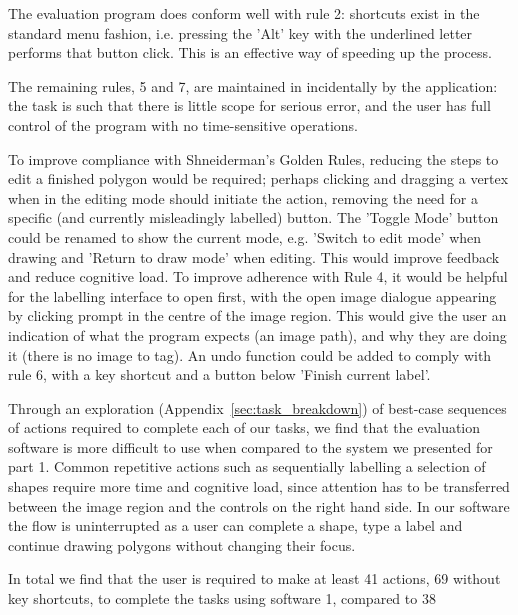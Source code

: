 \documentclass[a4paper,11pt,oneside]{article}
\begin{document}
The evaluation program does conform well with rule 2: shortcuts exist in the standard menu fashion, i.e. pressing the 'Alt' key with the underlined letter performs that button click. This is an effective way of speeding up the process.

The remaining rules, 5 and 7, are maintained in incidentally by the application: the task is such that there is little scope for serious error, and the user has full control of the program with no time-sensitive operations.

To improve compliance with Shneiderman's Golden Rules, reducing the steps to edit a finished polygon would be required; perhaps clicking and dragging a vertex when in the editing mode should initiate the action, removing the need for a specific (and currently misleadingly labelled) button. The 'Toggle Mode' button could be renamed to show the current mode, e.g. 'Switch to edit mode' when drawing and 'Return to draw mode' when editing. This would improve feedback and reduce cognitive load. To improve adherence with Rule 4, it would be helpful for the labelling interface to open first, with the open image dialogue appearing by clicking prompt in the centre of the image region. This would give the user an indication of what the program expects (an image path), and why they are doing it (there is no image to tag). An undo function could be added to comply with rule 6, with a key shortcut and a button below 'Finish current label'.

Through an exploration (Appendix~\ref{sec:task_breakdown}) of best-case sequences of actions required to complete each of our tasks, we find that the evaluation software is more difficult to use when compared to the system we presented for part 1. Common repetitive actions such as sequentially labelling a selection of shapes require more time and cognitive load, since attention has to be transferred between the image region and the controls on the right hand side. In our software the flow is uninterrupted as a user can complete a shape, type a label and continue drawing polygons without changing their focus.

In total we find that the user is required to make at least 41 actions, 69 without key shortcuts, to complete the tasks using software 1, compared to 38
\end{document}
